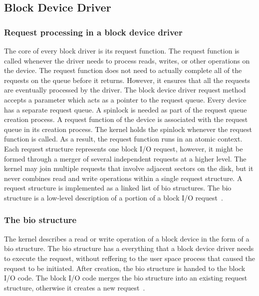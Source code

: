 \subsection*{Block Device Driver}
\subsubsection*{Request processing in a block device driver}
\label{subsec:request queue}
The core of every block driver is its request function. The request function is called whenever the driver needs to process reads, writes, or other operations on the device. The request function does not need to actually complete all of the requests on the queue before it returns. However, it ensures that all the requests are eventually processed by the driver. The block device driver request method accepts a parameter which acts as a pointer to the request queue. Every device has a separate request queue. A spinlock is needed as part of the request queue creation process. A request function of the device is associated with the request queue in its creation process. The kernel holds the spinlock whenever the request function is called. As a result, the request function runs in an atomic context.
\\[3mm]
Each request structure represents one block I/O request, however, it might be formed through a merger of several independent requests at a higher level.
The kernel may join multiple requests that involve adjacent sectors on the disk, but it never combines read and write operations within a single request structure. A request structure is implemented as a linked list of bio structures. The bio structure is a low-level description of a portion of a block I/O request~\cite{Corbet:2005:LDD:1209083}.

\subsubsection*{The bio structure}
The kernel describes a read or write operation of a block device in the form of a bio structure. The bio structure has a everything that a block device driver needs to execute the request, without reffering to the user space process that caused the request to be initiated. After creation, the bio structure is handed to the block I/O code. The block I/O code merges the bio structure into an existing request structure, otherwise it creates a new request~\cite{Corbet:2005:LDD:1209083}. 

